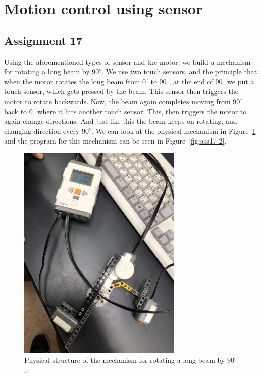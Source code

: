 \documentclass[12pt,a4paper]{report}
\begin{document}
\section{Motion control using sensor}
\subsection{\textbf{Assignment 17}}
Using the aforementioned types of sensor and the motor, we build a mechanism for rotating a long beam by \(90^{\circ}\). 
We use two touch sensors, and the principle that when the motor rotates the long beam from \(0^{\circ}\) to \(90^{\circ}\), 
at the end of \(90^{\circ}\) we put a touch sensor, which gets pressed by the beam. This sensor then triggers the motor to rotate 
backwards. Now, the beam again completes moving from \(90^{\circ}\) back to \(0^{\circ}\) where it hits another touch sensor. 
This, then triggers the motor to again change directions. And just like this the beam keeps on rotating, and changing direction 
every \(90^{\circ}\). We can look at the physical mechanism in Figure~\ref{fig:ass17-1} and the program for this mechanism 
can be seen in Figure~\ref{fig:ass17-2}. 
\begin{figure}[htbp]
        \centering
    \includegraphics[width=0.7\textwidth]{figures/ass17-1}
    \caption{Physical structure of the mechanism for rotating a long beam by $90^{\circ}$.}
    \label{fig:ass17-1}
\end{figure}
\end{document}
